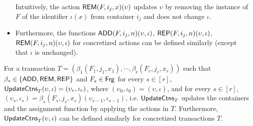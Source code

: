 \begin{itemize}
Intuitively, the action $\mathsf{REM}(F, i_j, x)(\upsilon)$ updates $\upsilon$ by removing the instance of $F$ of the identifier $\iota(x)$ from container $i_j$ and does not change $\iota$.
%
\item Furthermore, the functions $\mathsf{ADD}(F, i_j, n)(\upsilon, \iota)$, $\mathsf{REP}(F, i_j, n)(\upsilon, \iota)$, $\mathsf{REM}(F, i_j, n)(\upsilon, \iota)$ for concretized actions can be defined similarly (except that $\iota$ is unchanged).
\end{itemize}

For a  transaction $T=(\beta_1(F_1, j_1, x_1), \cdots, \beta_{r}(F_r, j_r, x_r))$ such that $\beta_s \in \{\mathsf{ADD},\mathsf{REM},\mathsf{REP}\}$ and $F_s \in {\sf Frg}$ for every $s \in [r]$, 
 $\mathsf{UpdateCtns}_T(\upsilon, \iota)= (\upsilon_r, \iota_r)$, where $(\upsilon_0, \iota_0) = (\upsilon, \iota)$, and for every $s \in [r]$, $(\upsilon_s, \iota_s) = \beta_s(F_s, j_s, x_s)(\upsilon_{s-1}, \iota_{s-1})$, i.e. $\mathsf{UpdateCtns}_T$ updates the containers and the assignment function by applying the actions in $T$. Furthermore, $\mathsf{UpdateCtns}_T(\upsilon, \iota)$ can be defined similarly for concretized transactions $T$.


%    
  
%
%

